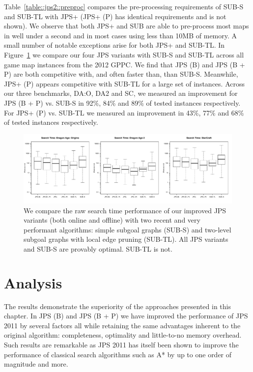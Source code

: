 Table~\ref{table::jps2::preproc} compares the pre-processing requirements of 
SUB-S and SUB-TL with JPS+ (JPS+ (P) has identical requirements and is not shown). 
We observe that both JPS+ and SUB are able to pre-process most maps in well under a second 
and in most cases using less than 10MB of memory. A small number of notable exceptions 
arise for both JPS+ and SUB-TL.
In Figure~\ref{fig::jps2::vs_sub} we compare our four JPS variants with SUB-S and SUB-TL across all
game map instances from the 2012 GPPC. We find that JPS (B) and JPS (B + P) are both
competitive with, and often faster than, than SUB-S. Meanwhile, JPS+ (P) appears competitive 
with SUB-TL for a large set of instances.
Across our three benchmarks, DA:O, DA2 and SC, we measured an improvement for 
JPS (B + P) vs. SUB-S in 92\%, 84\% and 89\% of tested instances respectively.
For JPS+ (P) vs. SUB-TL we measured an improvement in 43\%, 77\% and 68\% of 
tested instances respectively.

\begin{figure} 
\begin{center}
		   \includegraphics[width=\columnwidth, trim = 0mm 0mm 0mm 0mm]
			{chapter_jps2/diagrams/jps_vs_sub_boxplot.pdf}
       \end{center}
\caption[Search time performance: JPS+ vs. SUB] 
{\small
We compare the raw search time performance of our improved JPS variants (both
online and offline) with two recent and very performant algorithms: simple
subgoal graphs (SUB-S) and two-level subgoal graphs with local edge pruning
(SUB-TL). All JPS variants and SUB-S are provably optimal. SUB-TL is not.}
\label{fig::jps2::vs_sub}
\end{figure}

\section{Analysis}
The results demonstrate the superiority of the approaches presented in this
chapter. In JPS (B) and JPS (B + P) we have improved the performance of
JPS 2011 by several factors all while retaining
the same advantages inherent to the original algorithm: completeness, 
optimality and little-to-no memory overhead. Such results are remarkable as
JPS 2011 has itself been shown to improve the performance of classical
search algorithms such as A* by up to one order of magnitude and more.

